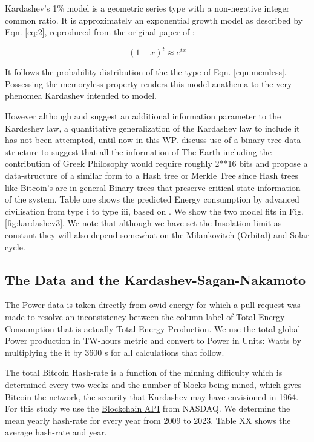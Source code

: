 \documentclass[final,5p,times,twocolumn,authoryear]{elsarticle}
\begin{document}
Kardashev's 1\% model is a geometric series type with a non-negative integer common ratio. It is approximately an exponential growth model as described by Eqn. \ref{eq:2}, reproduced from the original paper of \cite{kar64}:

\begin{equation}
(1+x)^t \approx e^{tx}
\label{eq:2}
\end{equation}

It follows the probability distribution of the the type of Eqn. \ref{eqn:memless}. Possessing the memoryless property renders this model anathema to the very phenomea Kardashev intended to model.

 However although \cite{sagan73} and \cite{kar64} suggest an additional information parameter to the Kardeshev law, a quantitative generalization of the Kardashev law to include it has not been attempted, until now in this WP.  \cite{sagan73} discuss use of a binary tree data-structure to suggest that all the information of The Earth including the contribution of Greek Philosophy would require roughly 2**16 bits and propose a data-structure of a similar form to a Hash tree or Merkle Tree since Hash trees like Bitcoin's are in general Binary trees that preserve critical state information of the system. Table one shows the predicted Energy consumption by advanced civilisation from type i to type iii, based on \cite{kar64}. We show the two model fits in Fig. \ref{fig:kardashev3}. We note that although we have set the Insolation limit as constant they will also depend somewhat on the Milankovitch (Orbital) and Solar cycle. 

\subsection{The Data and the Kardashev-Sagan-Nakamoto}
\label{subsec: data}

The Power data is taken directly from \href{https://github.com/owid/energy-data}{owid-energy} for which a pull-request was \href{https://github.com/owid/energy-data/pull/23}{made} to resolve an inconsistency between the column label of Total Energy Consumption that is actually Total Energy Production. We use the total global Power production in TW-hours metric and convert to Power in Units: Watts by multiplying the it by 3600 s for all calculations that follow.

The total Bitcoin Hash-rate is a function of the minning difficulty which is determined every two weeks and the number of blocks being mined, which gives Bitcoin the network, the security that Kardashev may have envisioned in 1964. For this study we use the \href{https://data.nasdaq.com/data/BCHAIN/HRATE-bitcoin-hash-rate}{Blockchain API} from NASDAQ. We determine the mean yearly hash-rate for every year from 2009 to 2023. Table XX shows the average hash-rate and year. 
\end{document}
